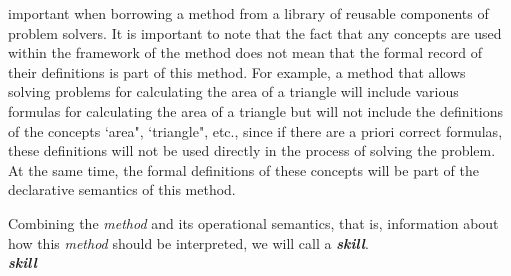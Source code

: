 \documentclass{report}
\begin{document}
\newcommand{\skill}{\textit{skill}}
\newcommand{\method}{\textit{method}}
\renewcommand{\thesection}{\Roman{section}}
\titleformat{\section}{\large\centering\sc}{\thesection. }{0cm}{}[]

\setcounter{page}{71}
\setcounter{section}{7}

\begin{multicols}{2}
important when borrowing a method from a library of
reusable components of problem solvers. It is important
to note that the fact that any concepts are used within
the framework of the method does not mean that the
formal record of their definitions is part of this method.
For example, a method that allows solving problems for
calculating the area of a triangle will include various
formulas for calculating the area of a triangle but will not
include the definitions of the concepts ‘area", ‘triangle",
etc., since if there are a priori correct formulas, these
definitions will not be used directly in the process of
solving the problem. At the same time, the formal
definitions of these concepts will be part of the declarative
semantics of this method.
\par Combining the \textit{method} and its operational semantics,
that is, information about how this \textit{method} should be
interpreted, we will call a \textbf{\textit{skill}}.\hfill
\vspace{4mm}
\\ \textbf{\textit{skill}}


\newenvironment{bracket}
    {\textbf{\{}\begin{minipage}[t]{0.8\linewidth}\begin{itemize}[noitemsep]}
    {\end{itemize}\end{minipage}}


\end{multicols}
\end{document}
